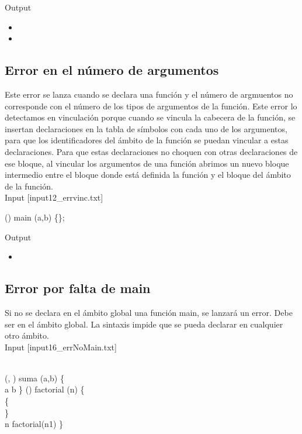 Output

\begin{itemize}
	\item {}
	\item {}
\end{itemize}

\subsection{Error en el número de argumentos}

Este error se lanza cuando se declara una función y el número de argmuentos no corresponde con el número de los
tipos de argumentos de la función. Este error lo detectamos en vinculación porque cuando se vincula la cabecera de 
la función, se insertan declaraciones en la tabla de símbolos con cada uno de los argumentos, para que los identificadores
del ámbito de la función se puedan vincular a estas declaraciones. Para que estas declaraciones no choquen con otras
declaraciones de ese bloque, al vincular los argumentos de una función abrimos un nuevo bloque intermedio entre el bloque
donde está definida la función y el bloque del ámbito de la función.\\

Input [input12\_errvinc.txt]

\begin{algorithm}
	\Integer{}(\Integer{}) main (a,b) \{\};
\end{algorithm}

Output

\begin{itemize}
	\item {}
\end{itemize}

\subsection{Error por falta de main}
Si no se declara en el ámbito global una función main, se lanzará un error. Debe ser en el ámbito global.
La sintaxis impide que se pueda declarar en cualquier otro ámbito.\\

Input [input16\_errNoMain.txt]

\begin{algorithm}
	\\
	\Integer{}(\Integer{}, \Integer{}) suma (a,b) \{\\
		\quad \Returnn a \operator{+} b\;
	\}\;
	\Integer{}(\Integer{}) factorial (n) \{\\
		\quad {} \{ \\
		\quad \quad {}\;
		\quad \}\\
		\quad \Returnn n \operator{*} factorial(n\operator{-}1)\;
	\}\;
\end{algorithm}

